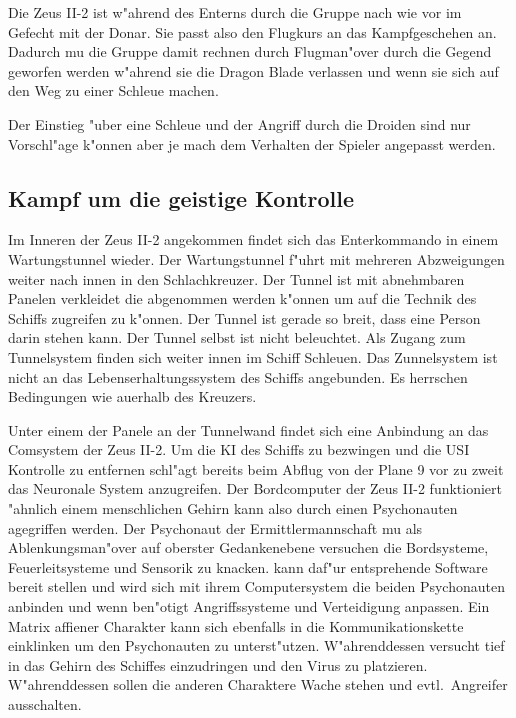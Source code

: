 \begin{remarks}
	Die Zeus II-2 ist w"ahrend des Enterns durch die Gruppe nach wie vor im Gefecht mit der Donar. Sie passt also den Flugkurs an das Kampfgeschehen an. Dadurch mu\3 die Gruppe damit rechnen durch Flugman"over durch die Gegend geworfen werden w"ahrend sie die Dragon Blade verlassen und wenn sie sich auf den Weg zu einer Schleu\3e machen.

	Der Einstieg "uber eine Schleu\3e und der Angriff durch die Droiden sind nur Vorschl"age k"onnen aber je mach dem Verhalten der Spieler angepasst werden.
\end{remarks}

\subsection{Kampf um die geistige Kontrolle}
Im Inneren der Zeus II-2 angekommen findet sich das Enterkommando in einem Wartungstunnel wieder. Der Wartungstunnel f"uhrt mit mehreren Abzweigungen weiter nach innen in den Schlachkreuzer. Der Tunnel ist mit abnehmbaren Panelen verkleidet die abgenommen werden k"onnen um auf die Technik des Schiffs zugreifen zu k"onnen. Der Tunnel ist gerade so breit, dass eine Person darin stehen kann. Der Tunnel selbst ist nicht beleuchtet. Als Zugang zum Tunnelsystem finden sich weiter innen im Schiff Schleu\3en. Das Zunnelsystem ist nicht an das Lebenserhaltungssystem des Schiffs angebunden. Es herrschen Bedingungen wie au\3erhalb des Kreuzers.

Unter einem der Panele an der Tunnelwand findet sich eine Anbindung an das Comsystem der Zeus II-2. Um die KI des Schiffs zu bezwingen und die USI Kontrolle zu entfernen schl"agt \xl{} bereits beim Abflug von der Plane 9 vor zu zweit das Neuronale System anzugreifen. Der Bordcomputer der Zeus II-2 funktioniert "ahnlich einem menschlichen Gehirn kann also durch einen Psychonauten agegriffen werden. Der Psychonaut der Ermittlermannschaft mu\3 als Ablenkungsman"over auf oberster Gedankenebene versuchen die Bordsysteme, Feuerleitsysteme und Sensorik zu knacken. \ml{} kann daf"ur entsprehende Software bereit stellen und wird sich mit ihrem Computersystem die beiden Psychonauten anbinden und wenn ben"otigt Angriffssysteme und Verteidigung anpassen. Ein Matrix affiener Charakter kann sich ebenfalls in die Kommunikationskette einklinken um den Psychonauten zu unterst"utzen. W"ahrenddessen versucht \xl{} tief in das Gehirn des Schiffes einzudringen und den Virus zu platzieren. W"ahrenddessen sollen die anderen Charaktere Wache stehen und evtl.~Angreifer ausschalten.

